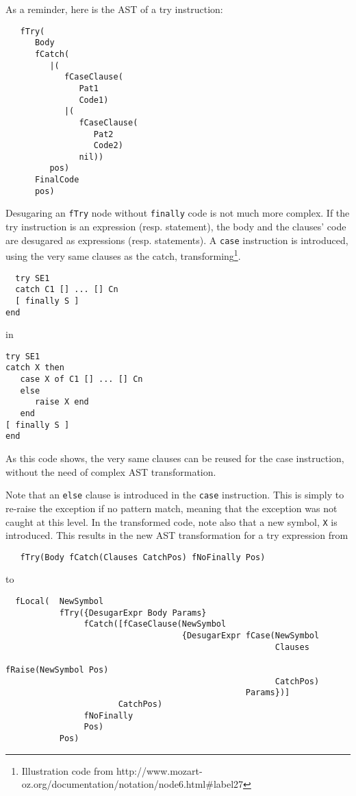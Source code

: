 \documentclass[a4paper]{memoir}
\begin{document}
As a reminder, here is the AST of a try instruction:
\begin{lstlisting}
   fTry(
      Body
      fCatch(
         |(
            fCaseClause(
               Pat1
               Code1)
            |(
               fCaseClause(
                  Pat2
                  Code2)
               nil))
         pos)
      FinalCode
      pos)
\end{lstlisting}
Desugaring an \lstinline!fTry! node without \lstinline!finally! code is not much
more complex.  If the try instruction is an expression (resp. statement), the
body and the clauses' code are desugared as expressions (resp. statements).
A \lstinline!case! instruction is introduced, using the very same clauses as the
catch, transforming\footnote[number]{Illustration code from http://www.mozart-oz.org/documentation/notation/node6.html\#label27}. 
\begin{lstlisting}
  try SE1 
  catch C1 [] ... [] Cn 
  [ finally S ] 
end
\end{lstlisting}

in

\begin{lstlisting}
try SE1 
catch X then 
   case X of C1 [] ... [] Cn 
   else 
      raise X end 
   end 
[ finally S ] 
end
\end{lstlisting}

As this code shows, the very same clauses can be reused for the case
instruction, without the need of complex AST transformation.

Note that an \lstinline!else! clause is introduced in the \lstinline!case!
instruction. This is simply to re-raise the exception if no pattern match,
meaning that the exception was not caught at this level.
In the transformed code, note also that a new symbol, \lstinline!X! is
introduced. This results in the new AST transformation for a try expression from
\begin{lstlisting}
   fTry(Body fCatch(Clauses CatchPos) fNoFinally Pos)
\end{lstlisting}
to
\begin{lstlisting}
  fLocal(  NewSymbol
           fTry({DesugarExpr Body Params} 
                fCatch([fCaseClause(NewSymbol 
                                    {DesugarExpr fCase(NewSymbol 
                                                       Clauses 
                                                       fRaise(NewSymbol Pos) 
                                                       CatchPos) 
                                                 Params})] 
                       CatchPos) 
                fNoFinally 
                Pos)
           Pos)
\end{lstlisting}
\end{document}
